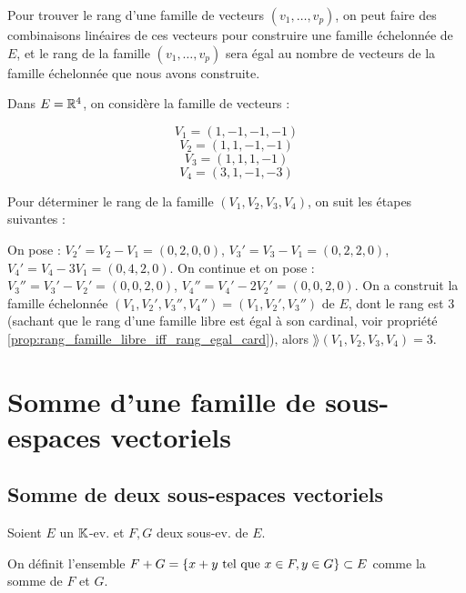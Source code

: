 \documentclass[12pt, a4paper]{report}
\begin{document}
\begin{methodbox}
    Pour trouver le rang d'une famille de vecteurs $(v_1,\dots,v_p)$, on peut faire des combinaisons linéaires de ces vecteurs pour construire une famille échelonnée de $E$, et le rang de la famille $(v_1,\dots,v_p)$ sera égal au nombre de vecteurs de la famille échelonnée que nous avons construite.
\end{methodbox}

\begin{example}
    Dans $E = \mathbb{R}^4$, on considère la famille de vecteurs :

    $$V_1 = (1,-1,-1,-1)$$
    $$V_2 = (1,1,-1,-1)$$
    $$V_3 = (1,1,1,-1)$$
    $$V_4 = (3,1,-1,-3)$$

    Pour déterminer le rang de la famille $(V_1,V_2,V_3,V_4)$, on suit les étapes suivantes :

    \begin{outline}
        \1 On pose :
            \2 $V_2' = V_2 - V_1 = (0,2,0,0)$,
            \2 $V_3' = V_3 - V_1 = (0,2,2,0)$,
            \2 $V_4' = V_4 - 3V_1 = (0,4,2,0)$.
        \1 On continue et on pose :
            \2 $V_3'' = V_3' - V_2' = (0,0,2,0)$,
            \2 $V_4'' = V_4' - 2V_2' = (0,0,2,0)$.
        \1 On a construit la famille échelonnée $(V_1,V_2',V_3'',V_4'')=(V_1,V_2',V_3'')$ de $E$, dont le rang est $3$ (sachant que le rang d'une famille libre est égal à son cardinal, voir propriété \ref{prop:rang_famille_libre_iff_rang_egal_card}), alors $\rang(V_1,V_2,V_3,V_4) = 3$.
    \end{outline}
\end{example}

\chapter{Somme d'une famille de sous-espaces vectoriels}

\section{Somme de deux sous-espaces vectoriels}

\begin{definition}
    Soient $E$ un $\mathbb{K}$-ev. et $F,G$ deux sous-ev. de $E$.

    On définit l'ensemble $F+G = \{x+y \text{ tel que } x \in F, y \in G\} \subset E$ comme la somme de $F$ et $G$.
\end{definition}
\end{document}
